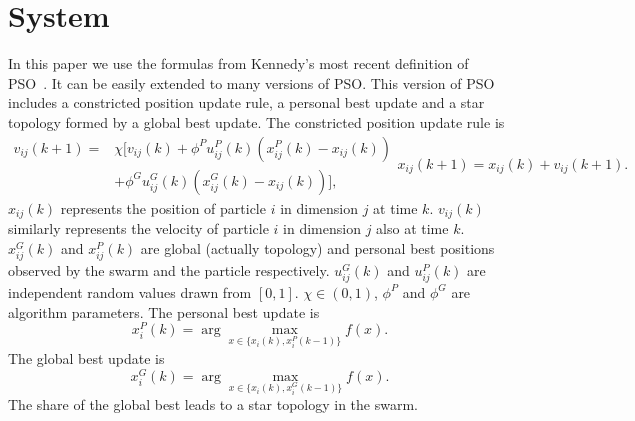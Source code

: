 \section{System}
\label{sec:system}

In this paper we use the formulas from Kennedy's most recent definition of PSO~\cite{4223164}.
It can be easily extended to many versions of PSO.
This version of PSO includes a constricted position update rule, a personal best update and a star topology formed by a global best update.
The constricted position update rule is
\begin{subequations}
\label{eq:pso_alg}
\begin{equation}
\label{eq:up_vel}
\begin{aligned}
v_{ij}(k+1) = &  \chi [ v_{ij}(k) 
 + \phi^{P} u^{P}_{ij}(k) (x^{P}_{ij}(k) - x_{ij}(k))\\
 & + \phi^{G} u^{G}_{ij}(k) ( x^{G}_{ij}(k) - x_{ij}(k)) ],
\end{aligned}
\end{equation}
\begin{equation}
\label{eq:up_pos}
x_{ij}(k+1) = x_{ij}(k) + v_{ij}(k+1).
\end{equation}
\end{subequations}
$ x_{ij}(k) $ represents the position of particle $ i $ in dimension $ j $ at time $ k $.
$ v_{ij}(k) $ similarly represents the velocity of particle $ i $ in dimension $ j $ also at time $ k $.
$ x^{G}_{ij}(k) $ and $ x^{P}_{ij}(k) $ are global (actually topology) and personal best positions observed by the swarm and the particle respectively. 
$ u^{G}_{ij}(k) $ and $ u^{P}_{ij}(k) $ are independent random values drawn from $ [0,1] $.
$ \chi \in ( 0, 1 ) $, $ \phi^{P} $ and $ \phi^{G} $ are algorithm parameters.
The personal best update is
\begin{equation}
\label{eq:pb_up}
x_{i}^{P}(k) = \arg \max_{ x \in \{ x_{i}(k), x_{i}^{P}(k-1) \} } f(x).
\end{equation}
The global best update is
\begin{equation}
\label{eq:gb_up}
x_{i}^{G}(k) = \arg \max_{ x \in \{ x_{i}(k), x_{i}^{G}(k-1) \} } f(x).
\end{equation}
The share of the global best leads to a star topology in the swarm.

